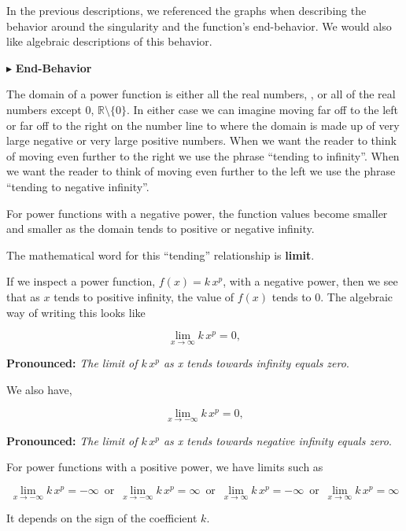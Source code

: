 \documentclass{ximera}
\begin{document}
In the previous descriptions, we referenced the graphs when describing the behavior around the singularity and the function's end-behavior.  We would also like algebraic descriptions of this behavior.


$\blacktriangleright$  \textbf{End-Behavior}

The domain of a power function is either all the real numbers, , or all of the real numbers except $0$, $\mathbb{R} \setminus \{ 0 \}$.  In either case we can imagine moving far off to the left or far off to the right on the number line to where the domain is made up of very large negative or very large positive numbers.  When we want the reader to think of moving even further to the right we use the phrase ``tending to infinity''. When we want the reader to think of moving even further to the left we use the phrase ``tending to negative infinity''.

For power functions with a negative power, the function values become smaller and smaller as the domain tends to positive or negative infinity.

The mathematical word for this ``tending'' relationship is \textbf{\textcolor{purple!85!blue}{limit}}.

If we inspect a power function, $f(x) = k \, x^p$, with a negative power, then we see that as $x$ tends to positive infinity, the value of $f(x)$ tends to $0$.  The algebraic way of writing this looks like


\[    \lim_{x \to \infty} k \, x^p = 0,        \]


\textbf{\textcolor{blue!55!black}{Pronounced:}} \textit{The limit of $k \, x^p$ as x tends towards infinity equals zero}.


We also have,

\[    \lim_{x \to -\infty} k \, x^p = 0,        \]


\textbf{\textcolor{blue!55!black}{Pronounced:}} \textit{The limit of $k \, x^p$ as x tends towards negative infinity equals zero}.


For power functions with a positive power, we have limits such as 



\[    \lim_{x \to -\infty} k \, x^p =  -\infty  \,   \text{ or }  \,  \lim_{x \to -\infty} k \, x^p =  \infty  \,   \text{ or }  \,     \lim_{x \to \infty} k \, x^p = -\infty  \,  \text{ or }  \,     \lim_{x \to \infty} k \, x^p = \infty  \]




It depends on the sign of the coefficient $k$.
\end{document}
